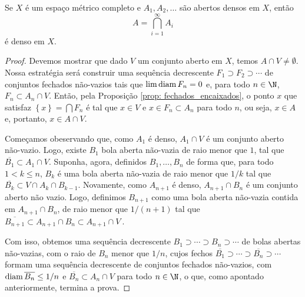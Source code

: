 \begin{teo}
    Se \( X \) é um espaço métrico completo e \( A_{ 1 }, A_{ 2 }, \dots \) são abertos densos em \( X \), então \[
        A = \bigcap_{ i=1 }^{ \infty } A_{ i }
    \]
    é denso em \( X \).
\end{teo}

\begin{proof}
    Devemos mostrar que dado \( V \) um conjunto aberto em \( X \), temos \( A \cap V \neq \emptyset \).
    Nossa estratégia será construir uma sequência decrescente \( F_{ 1 } \supset F_{ 2 } \supset \cdots \) de conjuntos fechados não-vazios tais que \( \lim \operatorname{diam} F_{ n } = 0 \) e, para todo \( n \in \N \), \( F_{ n } \subset A_{ n } \cap V \).
    Então, pela Proposição \ref{prop: fechados_encaixados}, o ponto \( x \) que satisfaz \( \left\{ x \right\} = \bigcap F_{ n } \) é tal que \( x \in V \) e \( x \in F_{ n } \subset A_{ n } \) para todo \( n \), ou seja, \( x \in A \) e, portanto, \( x \in A \cap V \).

    Começamos obeservando que, como \( A_{ 1 } \) é denso, \( A_{ 1 } \cap V \) é um conjunto aberto não-vazio.
    Logo, existe \( B_{ 1 } \) bola aberta não-vazia de raio menor que \( 1 \), tal que \( \overline{B_{ 1 }} \subset A_{ 1 } \cap V \).
    Suponha, agora, definidos \( B_{ 1 }, \dots, B_{ n } \) de forma que, para todo \( 1 < k \leq n \), \( B_{ k } \) é uma bola aberta não-vazia de raio menor que \( 1/k \) tal que \( \overline{B_{ k }} \subset V \cap A_{ k } \cap B_{ k-1 } \).
    Novamente, como \( A_{ n+1 } \) é denso, \( A_{ n+1 } \cap B_{ n } \) é um conjunto aberto não vazio.
    Logo, definimos \( B_{ n+1 } \) como uma bola aberta não-vazia contida em \( A_{ n+1 } \cap B_{ n } \), de raio menor que \( 1/( n+1 ) \) tal que \( \overline{B_{ n+1 }} \subset A_{ n+1 } \cap B_{ n } \subset A_{ n+1 } \cap V \ \).

    Com isso, obtemos uma sequência decrescente \( B_{ 1 } \supset \cdots \supset B_{ n } \supset \cdots \) de bolas abertas não-vazias, com o raio de \( B_{ n } \) menor que \( 1/n \), cujos fechos \( \overline{B_{ 1 }} \supset \cdots \supset \overline{B_{ n }} \supset \cdots \) formam uma sequência decrescente de conjuntos fechados não-vazios, com \( \operatorname{diam} \overline{B_{ n }} \leq 1/n \) e \( \overline{B_{ n }} \subset A_{ n } \cap V \) para todo \( n \in \N \), o que, como apontado anteriormente, termina a prova.
\end{proof}


